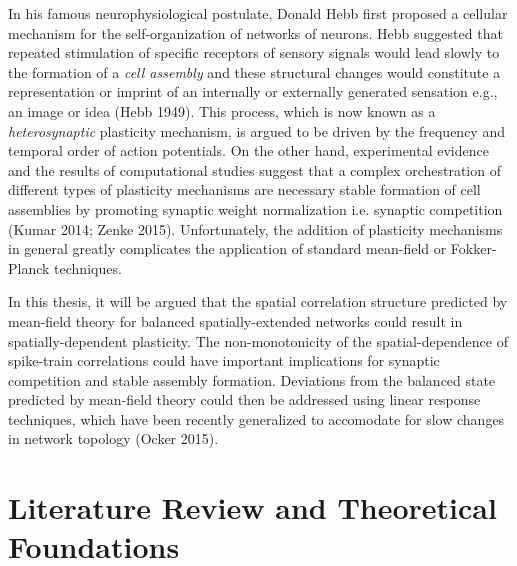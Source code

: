 \documentclass{ucetd}
\begin{document}
In his famous neurophysiological postulate, Donald Hebb first proposed a cellular mechanism for the self-organization of networks of neurons. Hebb suggested that repeated stimulation of specific receptors of sensory signals would lead slowly to the formation of a \emph{cell assembly} and these structural changes would constitute a representation or imprint of an internally or externally generated sensation e.g., an image or idea (Hebb 1949). This process, which is now known as a \emph{heterosynaptic} plasticity mechanism, is argued to be driven by the frequency and temporal order of action potentials. On the other hand, experimental evidence and the results of computational studies suggest that a complex orchestration of different types of plasticity mechanisms are necessary stable formation of cell assemblies by promoting synaptic weight normalization i.e. synaptic competition (Kumar 2014; Zenke 2015). Unfortunately, the addition of plasticity mechanisms in general greatly complicates the application of standard mean-field or Fokker-Planck techniques. 

In this thesis, it will be argued that the spatial correlation structure predicted by mean-field theory for balanced spatially-extended networks could result in spatially-dependent plasticity. The non-monotonicity of the spatial-dependence of spike-train correlations could have important implications for synaptic competition and stable assembly formation. Deviations from the balanced state predicted by mean-field theory could then be addressed using linear response techniques, which have been recently generalized to accomodate for slow changes in network topology (Ocker 2015).

\clearpage
\section{Literature Review and Theoretical Foundations}
\end{document}
